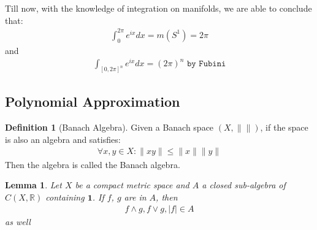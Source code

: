\documentclass[12pt,fleqn]{book}
\newtheorem{lemma}[theorem]{Lemma}
\theoremstyle{definition}
\newtheorem{definition}{Definition}[section]
\begin{document}
Till now, with the knowledge of integration on manifolds, we are able to conclude that:
\begin{align*}
	\int_0^{2\pi} e^{ix}  dx = m(S^1) = 2\pi
\end{align*}
and
\begin{align*}
	\int_{[0, 2\pi]^n} e^{ix} dx = (2\pi)^n \texttt{ by Fubini} 
\end{align*}







\subsection{Polynomial Approximation}
\begin{definition}[Banach Algebra]
	Given a Banach space $(X, \| \|)$, if the space is also an algebra and satisfies:
	\begin{align*}
		\forall x, y \in X: \|xy\| \leq \|x\|\|y\|
	\end{align*} 
	Then the algebra is called the Banach algebra.
\end{definition}

\begin{lemma}
	Let $X$ be a compact metric space and $A$ a closed sub-algebra of $C(X, \mathbb{R})$ containing $\mathbf{1}$. If $f$, $g$ are in $A$, then 
	\begin{align*}
		f \wedge g, f \vee g, |f| \in A
	\end{align*}
	as well
\end{lemma}
\end{document}

